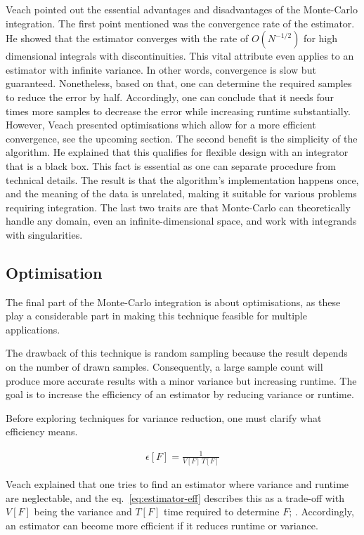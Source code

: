 Veach \cite{veach_robust_1997} pointed out the essential advantages and disadvantages of the Monte-Carlo integration.
The first point mentioned was the convergence rate of the estimator.
He showed that the estimator converges with the rate of $O(N^{-1/2})$ for high dimensional integrals with discontinuities.
This vital attribute even applies to an estimator with infinite variance. 
In other words, convergence is slow but guaranteed.
Nonetheless, based on that, one can determine the required samples to reduce the error by half.
Accordingly, one can conclude that it needs four times more samples to decrease the error while increasing runtime substantially.
However, Veach presented optimisations which allow for a more efficient convergence, see the upcoming section.
The second benefit is the simplicity of the algorithm.
He explained that this qualifies for flexible design with an integrator that is a black box.
This fact is essential as one can separate procedure from technical details.
The result is that the algorithm's implementation happens once, and the meaning of the data is unrelated, making it suitable for various problems requiring integration.
The last two traits are that Monte-Carlo can theoretically handle any domain, even an infinite-dimensional space, and work with integrands with singularities.

\subsection*{Optimisation}

The final part of the Monte-Carlo integration is about optimisations, as these play a considerable part in making this technique feasible for multiple applications.

The drawback of this technique is random sampling because the result depends on the number of drawn samples.
Consequently, a large sample count will produce more accurate results with a minor variance but increasing runtime.
The goal is to increase the efficiency of an estimator by reducing variance or runtime.

Before exploring techniques for variance reduction, one must clarify what efficiency means.

\begin{align}
\epsilon[F]=\frac{1}{V[F]\,T[F]}
\label{eq:estimator-eff}
\end{align}

Veach explained that one tries to find an estimator where variance and runtime are neglectable, and the eq.~\ref{eq:estimator-eff} describes this as a trade-off with $V[F]$ being the variance and $T[F]$ time required to determine $F$; \cite{veach_robust_1997}.
Accordingly, an estimator can become more efficient if it reduces runtime or variance.

